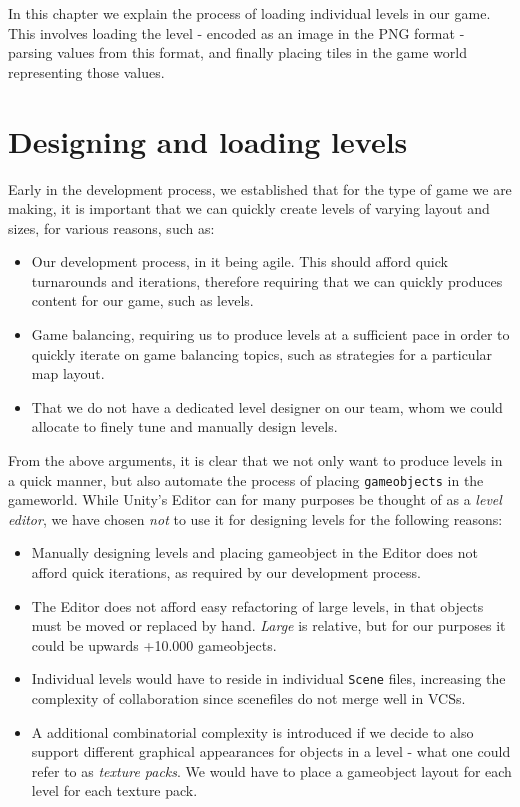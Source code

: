 In this chapter we explain the process of loading individual levels in our
game. This involves loading the level - encoded as an image in the PNG format -
parsing values from this format, and finally placing tiles in the game world
representing those values.

\section{Designing and loading levels}
Early in the development process, we established that for the type of game we
are making, it is important that we can quickly create levels of varying layout
and sizes, for various reasons, such as:
\begin{itemize}
    \item Our development process, in it being agile. This should afford quick
        turnarounds and iterations, therefore requiring that we can quickly
        produces content for our game, such as levels.
    \item Game balancing, requiring us to produce levels at a sufficient pace in
        order to quickly iterate on game balancing topics, such as strategies
        for a particular map layout.
    \item That we do not have a dedicated level designer on our team, whom we
        could allocate to finely tune and manually design levels.
\end{itemize}

From the above arguments, it is clear that we not only want to produce levels
in a quick manner, but also automate the process of placing
\texttt{gameobjects} in the gameworld. While Unity's Editor can for many purposes
be thought of as a \textit{level editor}, we have chosen \textit{not} to use it
for designing levels for the following reasons:
\begin{itemize}
    \item Manually designing levels and placing gameobject in the Editor does
        not afford quick iterations, as required by our development process.
    \item The Editor does not afford easy refactoring of large levels, in that
        objects must be moved or replaced by hand. \textit{Large} is relative,
        but for our purposes it could be upwards +10.000 gameobjects.
    \item Individual levels would have to reside in individual \texttt{Scene}
        files, increasing the complexity of collaboration since scenefiles do
        not merge well in VCSs.
    \item A additional combinatorial complexity is introduced if we decide to
        also support different graphical appearances for objects in a level -
        what one could refer to as \textit{texture packs}. We would have
        to place a gameobject layout for each level for each texture pack.
\end{itemize}

